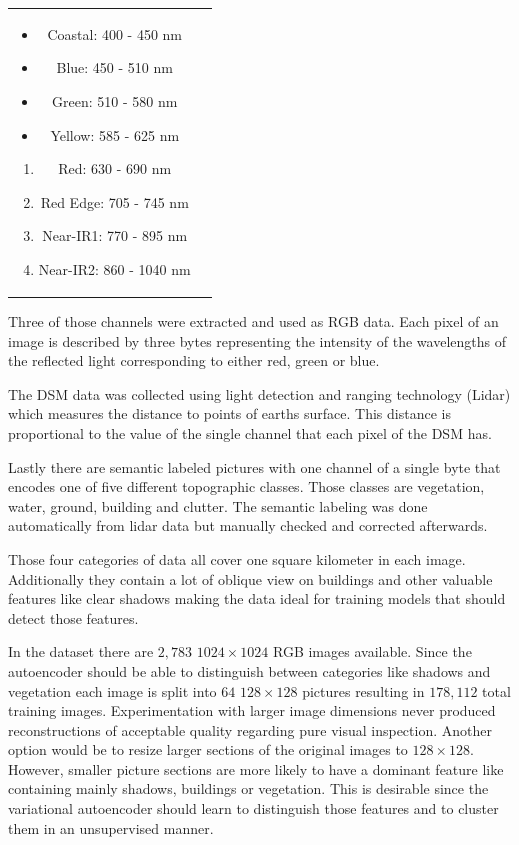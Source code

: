 \begin{tabular} {c c}
    \parbox{5cm}{
        \begin{itemize}
            \item Coastal: 400 - 450 nm 			
            \item Blue: 450 - 510 nm			
            \item Green: 510 - 580 nm 			
            \item Yellow: 585 - 625 nm
        \end{itemize}
    }
    \parbox{5cm}{
        \begin{enumerate} 			
            \item Red: 630 - 690 nm
            \item Red Edge: 705 - 745 nm
            \item Near-IR1: 770 - 895 nm
            \item Near-IR2: 860 - 1040 nm
        \end{enumerate}
    }
\end{tabular}
\bigskip

Three of those channels were extracted and used as RGB data. 
Each pixel of an image is described by three bytes representing the intensity of the wavelengths of the 
reflected light corresponding to either red, green or blue.

The DSM data was collected using light detection and ranging technology (Lidar) which measures the 
distance to points of earths surface. This distance is proportional to the value of the single channel
that each pixel of the DSM has.

Lastly there are semantic labeled pictures with one channel of a single byte that encodes one of five 
different topographic classes. Those classes are vegetation, water, ground, building and clutter. 
The semantic labeling was done automatically from lidar data but manually checked and corrected afterwards.

Those four categories of data all cover one square kilometer in each image.
Additionally they contain a lot of oblique view on buildings and other valuable
features like clear shadows making the data ideal for training models that should 
detect those features.

In the dataset there are $2,783$ $1024\times 1024$ RGB images available. Since the autoencoder should
be able to distinguish between categories like shadows and vegetation each image is split into $64$
$128\times 128$ pictures resulting in $178,112$ total training images. 
Experimentation with larger image dimensions never produced reconstructions of acceptable
quality regarding pure visual inspection.
Another option would be to resize larger sections of the original images to $128\times 128$. However,
smaller picture sections
are more likely to have a dominant feature like containing mainly shadows, buildings or vegetation.
This is desirable since the variational autoencoder should learn to distinguish those features and to cluster
them in an unsupervised manner.


